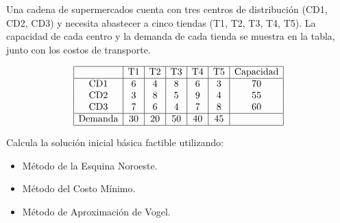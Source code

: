 \documentclass{article}
\begin{document}
\vspace{-.5cm}

\begin{problem}
Una cadena de supermercados cuenta con tres centros de distribución (CD1, CD2, CD3) y necesita abastecer a cinco tiendas (T1, T2, T3, T4, T5). La capacidad de cada centro y la demanda de cada tienda se muestra en la tabla, junto con los costos de transporte.

\[
\begin{array}{|c|c|c|c|c|c|c|}
\hline
           & \text{T1} & \text{T2} & \text{T3} & \text{T4} & \text{T5} & \text{Capacidad} \\
\hline
\text{CD1} & 6  & 4  & 8  & 6  & 3  & 70        \\
\text{CD2} & 3  & 8  & 5  & 9  & 4  & 55        \\
\text{CD3} & 7  & 6  & 4  & 7  & 8  & 60        \\
\hline
\text{Demanda} & 30 & 20 & 50 & 40 & 45 &           \\
\hline
\end{array}
\]

Calcula la solución inicial básica factible utilizando:
\begin{itemize}
    \item Método de la Esquina Noroeste.
    \item Método del Costo Mínimo.
    \item Método de Aproximación de Vogel.
\end{itemize}
\end{problem}
\end{document}
